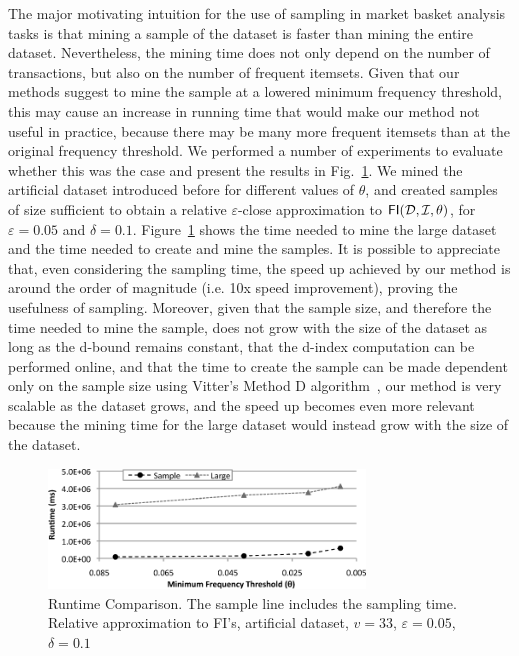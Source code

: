 The major motivating intuition for the use of sampling in market basket analysis
tasks is that mining a sample of the dataset is faster than mining the entire
dataset. Nevertheless, the mining time does not only depend on the number of
transactions, but also on the number of frequent itemsets. Given that our
methods suggest to mine the sample at a lowered minimum frequency threshold,
this may cause an increase in running time that would make our method not useful
in practice, because there may be many more frequent itemsets than at the
original frequency threshold. We performed a number of experiments to evaluate
whether this was the case and present the results in Fig.~\ref{fig:runtime}. 
We mined the artificial dataset introduced before for different values of $\theta$,
and created samples of size sufficient to obtain a relative $\varepsilon$-close
approximation to $\mathsf{FI}({\cal D},{\cal I},\theta)$, for $\varepsilon=0.05$ and
$\delta=0.1$. Figure~\ref{fig:runtime} shows the time needed to mine the large
dataset and the time needed to create and mine the samples. It is possible to
appreciate that, even considering the sampling time, the speed up achieved by
our method is around the order of magnitude (i.e. 10x speed improvement),
proving the usefulness of sampling. Moreover, given that the sample size, and
therefore the time needed to mine the sample, does not grow with the size of the
dataset as long as the d-bound remains constant, that the d-index computation
can be performed online, and that the time to create the sample can be made
dependent only on the sample size using Vitter's Method D
algorithm~\cite{Vitter87}, our method is very scalable as the dataset grows, and
the speed up becomes even more relevant because the mining time for the large
dataset would instead grow with the size of the dataset.

\begin{figure}[tp]
  \centering
  \includegraphics[width=0.75\textwidth]{vcmine/Fig4}
  \caption{Runtime Comparison. The sample line includes the sampling time.
  Relative approximation to FI's, artificial dataset, $v=33$, $\varepsilon=0.05$,
  $\delta=0.1$}
  \label{fig:runtime}
\end{figure}

